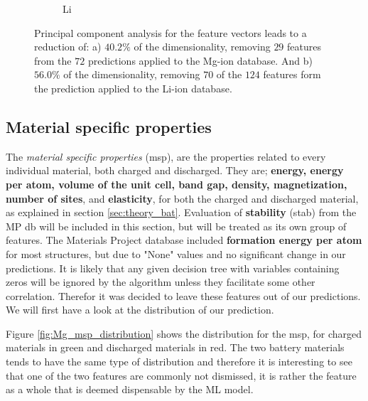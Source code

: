 \begin{figure}[H]
\begin{subfigure}{0.48\textwidth}
        \caption{Li}
        \label{fig:PCA_a}
    \end{subfigure}%
	\caption{Principal component analysis for the feature vectors leads to a reduction of: a) $40.2\%$ of the dimensionality, removing $29$ features from the $72$ predictions applied to the Mg-ion database. And b) $56.0\%$ of the dimensionality, removing $70$ of the $124$ features form the prediction applied to the Li-ion database.}
	\label{fig:PCA_dim}
\end{figure}
 


  
\subsection{Material specific properties}
The \textit{material specific properties} (\ac{msp}), are the properties related to every individual material, both charged and discharged. They are; \textbf{energy, energy per atom, volume of the unit cell, band gap, density, magnetization, number of sites}, and \textbf{elasticity}, for both the charged and discharged material, as explained in section \ref{sec:theory_bat}. Evaluation of \textbf{stability} (stab) from the MP db will be included in this section, but will be treated as its own group of features. The Materials Project database included \textbf{formation energy per atom} for most structures, but due to "None" values and no significant change in our predictions. It is likely that any given decision tree with variables containing zeros will be ignored by the algorithm unless they facilitate some other correlation. Therefor it was decided to leave these features out of our predictions. We will first have a look at the distribution of our prediction.

Figure \ref{fig:Mg_msp_distribution} shows the distribution for the msp, for charged materials in green and discharged materials in red. The two battery materials tends to have the same type of distribution and therefore it is interesting to see that one of the two features are commonly not dismissed, it is rather the feature as a whole that is deemed dispensable by the ML model.  

